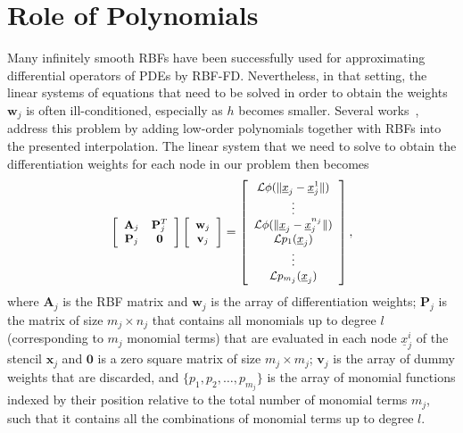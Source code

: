 \documentclass{UUThesisTemplate}
\begin{document}
\section{Role of Polynomials}
Many infinitely smooth RBFs have been successfully used for approximating differential operators of PDEs by RBF-FD. Nevertheless, in that setting, the linear systems of equations that need to be solved in order to obtain the weights $\mathbf{w}_j$ is often ill-conditioned, especially as $h$ becomes smaller. Several works~\cite{davydov2011adaptive, fornberg2011stabilization, flyer2012guide, larsson2013stable, fornberg2013stable, flyer2016enhancing}, address this problem by adding low-order polynomials together with RBFs into the presented interpolation. The linear system that we need to solve to obtain the differentiation weights for each node in our problem then becomes
\begin{equation}
{\footnotesize{
\label{eq:D2}
\left[\begin{array}{cc}
\mathbf{A}_j & \mathbf{P}_j^T \\
\mathbf{P}_j & \mathbf{0} \\
\end{array}\right]
\left[\begin{array}{c}
{\mathbf{w}}_j\\
{\mathbf{v}}_j\\
\end{array}\right]=
\left[\begin{array}{c}
\mathcal{L}\phi(\|\underline{x}_{j}-\underline{x}_j^{1}\|)\\
\vdots \\
\mathcal{L}\phi(\|\underline{x}_{j}-\underline{x}_j^{n_j}\|)\\
\mathcal{L}p_1(\underline{x}_j)\\
\vdots\\
\mathcal{L}p_{m_j}(\underline{x}_j)
\end{array}\right],
}}
\end{equation}
where $\mathbf{A}_j$ is the RBF matrix and $\mathbf{w}_j$ is the array of differentiation weights; $\mathbf{P}_j$ is the matrix of size $m_j \times n_j$ that contains all monomials up to degree $l$ (corresponding to $m_j$ monomial terms) that are evaluated in each node $\underline{x}_j^i$ of the stencil $\mathbf{x}_j$ and $\mathbf{0}$ is a zero square matrix of size $m_j \times m_j$; $\mathbf{v}_j$ is the array of dummy weights that are discarded, and $\{p_1, p_2, \ldots, p_{m_j}\}$ is the array of monomial functions indexed by their position relative to the total number of monomial terms $m_j$, such that it contains all the combinations of monomial terms up to degree $l$.
\end{document}
